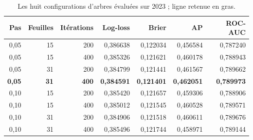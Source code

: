 \begin{table}[htbp]
\centering\small
\renewcommand{\arraystretch}{1.18}
\caption{Les huit configurations d'arbres évaluées sur 2023 ; ligne retenue en gras.}\label{tab:ml-selection-arbres}
\begin{tabularx}{\textwidth}{@{}rrrrrrr@{}}
\toprule
Pas & Feuilles & Itérations & Log-loss & Brier & AP & ROC-AUC \\
\midrule
0,05 & 15 & 200 & 0,386638 & 0,122034 & 0,456584 & 0,787240 \\
0,05 & 15 & 400 & 0,385326 & 0,121621 & 0,460178 & 0,788943 \\
0,05 & 31 & 200 & 0,384799 & 0,121441 & 0,461567 & 0,789662 \\
\textbf{0,05} & \textbf{31} & \textbf{400} & \textbf{0,384591} & \textbf{0,121401} & \textbf{0,462051} & \textbf{0,789973} \\
0,10 & 15 & 200 & 0,385420 & 0,121657 & 0,459306 & 0,788906 \\
0,10 & 15 & 400 & 0,385012 & 0,121545 & 0,460528 & 0,789571 \\
0,10 & 31 & 200 & 0,384906 & 0,121518 & 0,460611 & 0,789676 \\
0,10 & 31 & 400 & 0,385496 & 0,121744 & 0,458971 & 0,789144 \\
\bottomrule
\end{tabularx}
\end{table}

